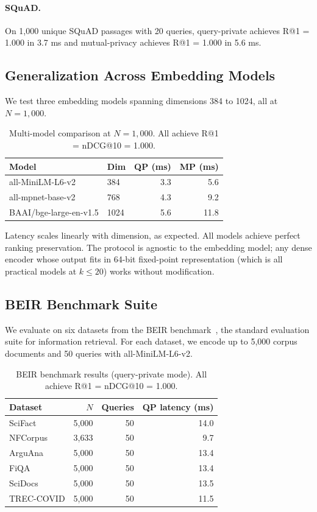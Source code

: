 \documentclass[11pt]{article}
\begin{document}
\paragraph{SQuAD.} On 1{,}000 unique SQuAD passages with 20 queries, query-private achieves R@1 = 1.000 in 3.7 ms and mutual-privacy achieves R@1 = 1.000 in 5.6 ms.

\subsection{Generalization Across Embedding Models}

We test three embedding models spanning dimensions 384 to 1024, all at $N = 1{,}000$.

\begin{table}[h]
\centering
\caption{Multi-model comparison at $N = 1{,}000$. All achieve R@1 = nDCG@10 = 1.000.}
\label{tab:multimodel}
\begin{tabular}{llrr}
\toprule
Model & Dim & QP (ms) & MP (ms) \\
\midrule
all-MiniLM-L6-v2 & 384 & 3.3 & 5.6 \\
all-mpnet-base-v2 & 768 & 4.3 & 9.2 \\
BAAI/bge-large-en-v1.5 & 1024 & 5.6 & 11.8 \\
\bottomrule
\end{tabular}
\end{table}

Latency scales linearly with dimension, as expected. All models achieve perfect ranking preservation. The protocol is agnostic to the embedding model; any dense encoder whose output fits in 64-bit fixed-point representation (which is all practical models at $k \leq 20$) works without modification.

\subsection{BEIR Benchmark Suite}

We evaluate on six datasets from the BEIR benchmark~\cite{thakur2021beir}, the standard evaluation suite for information retrieval. For each dataset, we encode up to 5{,}000 corpus documents and 50 queries with all-MiniLM-L6-v2.

\begin{table}[h]
\centering
\caption{BEIR benchmark results (query-private mode). All achieve R@1 = nDCG@10 = 1.000.}
\label{tab:beir}
\begin{tabular}{lrrr}
\toprule
Dataset & $N$ & Queries & QP latency (ms) \\
\midrule
SciFact & 5{,}000 & 50 & 14.0 \\
NFCorpus & 3{,}633 & 50 & 9.7 \\
ArguAna & 5{,}000 & 50 & 13.4 \\
FiQA & 5{,}000 & 50 & 13.4 \\
SciDocs & 5{,}000 & 50 & 13.5 \\
TREC-COVID & 5{,}000 & 50 & 11.5 \\
\bottomrule
\end{tabular}
\end{table}
\end{document}
